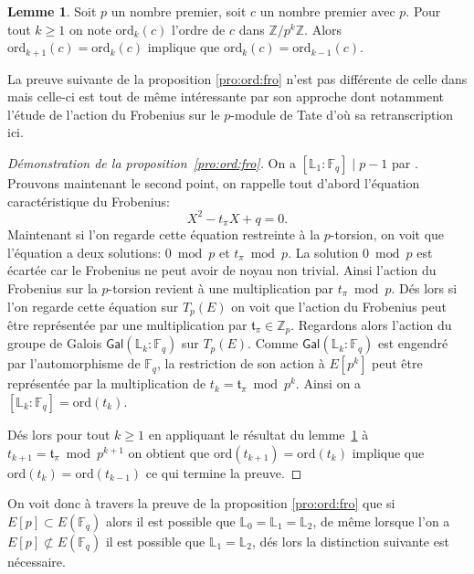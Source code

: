 \documentclass[10pt,a4paper]{book}
\theoremstyle{plain}
\theoremstyle{definition}
\theoremstyle{definition}
\newtheorem{lem}[thm]{Lemme}
\theoremstyle{definition}
\theoremstyle{definition}
\theoremstyle{definition}
\theoremstyle{remark}
\theoremstyle{remark}
\theoremstyle{definition}
\begin{document}
\begin{lem}
\label{lem:ord}
Soit $p$ un nombre premier, soit $c$ un nombre premier avec $p$. Pour tout $k \geqslant 1$ on note $\mathrm{ord}_k(c)$ l'ordre de $c$ dans $\mathbb{Z}/p^k\mathbb{Z}$. Alors $\mathrm{ord}_{k+1}(c)=\mathrm{ord}_k(c)$ implique que $\mathrm{ord}_k(c) = \mathrm{ord}_{k-1}(c)$.
\end{lem}

La preuve suivante de la proposition \ref{pro:ord:fro} n'est pas différente de celle dans \cite[Proposition 5]{DeFeo11} mais celle-ci est tout de même intéressante par son approche dont notamment l'étude de l'action du Frobenius sur le $p$-module de Tate d'où sa retranscription ici.

\begin{proof}[Démonstration de la proposition~\ref{pro:ord:fro}]
On a $[\mathbb{L}_1:\mathbb{F}_q] \mid p-1$ par \cite[Theorem 4]{Gunji76}. Prouvons maintenant le second point,
on rappelle tout d'abord l'équation caractéristique du Frobenius:
\begin{equation*}
X^2 - t_{\pi}X + q = 0.
\end{equation*}
Maintenant si l'on regarde cette équation restreinte à la $p$-torsion, on voit 
que l'équation a deux solutions: $0 \bmod p$ et $t_{\pi} \bmod p$. La solution 
$0 \bmod p$ est écartée car le Frobenius ne peut avoir de noyau non trivial. 
Ainsi l'action du Frobenius sur la $p$-torsion revient à une multiplication par
$t_{\pi} \bmod p$. Dés lors si l'on regarde cette équation sur $T_{p}(E)$ on 
voit que l'action du Frobenius peut être représentée par une multiplication par
$\mathfrak{t}_{\pi} \in \mathbb{Z}_{p} $. Regardons alors l'action du groupe de
Galois $\mathsf{Gal}(\mathbb{L}_k:\mathbb{F}_q)$ sur $T_{p}(E)$. Comme 
$\mathsf{Gal}(\mathbb{L}_k:\mathbb{F}_q)$ est engendré par l'automorphisme de 
$\mathbb{F}_q$, la restriction de son action à $E[p^k]$ peut être représentée 
par la multiplication de $t_k=\mathfrak{t}_{\pi}\bmod p^k$. Ainsi on a 
$[\mathbb{L}_k:\mathbb{F}_q]=\mathrm{ord}(t_k)$.

Dés lors pour tout $k\geqslant 1$ en appliquant le résultat du 
lemme~\ref{lem:ord} à $t_{k+1}=\mathfrak{t}_{\pi} \bmod p^{k+1}$ on obtient que
$\mathrm{ord}(t_{k+1})=\mathrm{ord}(t_{k})$ implique que $\mathrm{ord}(t_{k})=
\mathrm{ord}(t_{k-1})$ ce qui termine la preuve.
\end{proof}

On voit donc à travers la preuve de la proposition \ref{pro:ord:fro} que si $E[p] \subset E(\mathbb{F}_q)$ alors il est possible que $\mathbb{L}_0=\mathbb{L}_1=\mathbb{L}_2$, de même lorsque l'on a $E[p] \not\subset E(\mathbb{F}_q)$ il est possible que $\mathbb{L}_1=\mathbb{L}_2$, dés lors la distinction suivante est nécessaire.
\end{document}
